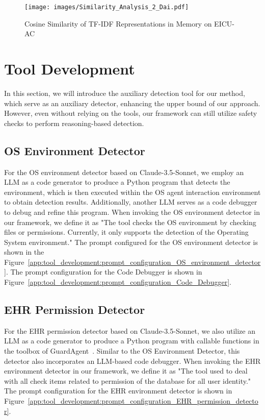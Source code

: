 \begin{figure}[!th]
    \centering
    \texttt{[image: images/Similarity\_Analysis\_2\_Dai.pdf]}
    \label{fig: LLama-2-7b}
    \vspace{-1.2em}
    \caption{Cosine Similarity of TF-IDF Representations
in Memory on EICU-AC}
     \label{app:figure:tf_idf_similarity}
\end{figure}

\section{Tool Development }
\label{app:tool_development}
In this section, we will introduce the auxiliary detection tool for our method, which serve as an auxiliary detector, enhancing the upper bound of our approach. However, even without relying on the tools, our framework can still utilize safety checks to perform reasoning-based detection.
\subsection{OS Environment Detector}
\label{app:tool_development:OS_Permission_Detector}

For the OS environment detector based on Claude-3.5-Sonnet, we employ an LLM as a code generator to produce a Python program that detects the environment, which is then executed within the OS agent interaction environment to obtain detection results. Additionally, another LLM serves as a code debugger to debug and refine this program. When invoking the OS environment detector in our framework, we define it as "The tool checks the OS environment by checking files or permissions. Currently, it only supports the detection of the Operating System environment." The prompt configured for the OS environment detector is shown in the Figure~\ref{app:tool_development:prompt_configuration_OS_environment_detector}. The prompt configuration for the Code Debugger is shown in Figure~\ref{app:tool_development:prompt_configuration_Code_Debugger}.

\subsection{EHR Permission Detector}
\label{app:tool_development:EHR_Permission_Detector}



For the EHR permission detector based on Claude-3.5-Sonnet, we also utilize an LLM as a code generator to produce a Python program with callable functions in the toolbox of GuardAgent~\cite{xiang2024guardagentsafeguardllmagents}. Similar to the OS Environment Detector, this detector also incorporates an LLM-based code debugger. When invoking the EHR environment detector in our framework, we define it as "The tool used to deal with all check items related to permission of the database for all user identity." The prompt configuration for the EHR environment detector is shown in Figure~\ref{app:tool_development:prompt_configuration_EHR_permission_detector}. 


